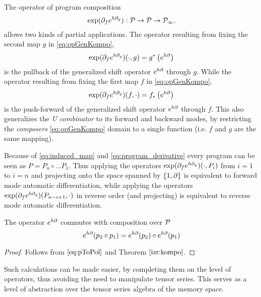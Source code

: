  The operator of program composition 
  \begin{equation}\label{eq:opGenKompo}
 \exp(\partial_fe^{h\partial_g}): \mathcal{P}\to\mathcal{P}\to\mathcal{P}_\infty,
  \end{equation}
  allows two kinds of partial applications. The operator resulting from fixing the second map $g$ in \eqref{eq:opGenKompo},
  \begin{equation}
   \exp(\partial_fe^{h\partial_g})(\cdot,g)=g^*\left( e^{h\partial} \right)\label{eq:opKompo}
 \end{equation}
  is the pullback of the generalized shift
  operator $e^{h\partial}$ through $g$. While the operator resulting from fixing the first map $f$ in \eqref{eq:opGenKompo},
  \begin{equation}
 \exp(\partial_fe^{h\partial_g})(f,\cdot)=f_*\left( e^{h\partial} \right)\label{eq:opKompoForward}
 \end{equation} 
 is the push-forward of the generalized shift operator $e^{h\partial}$ through $f$.
This also generalizes the \emph{U combinator} to its forward and backward modes, by restricting the \emph{composers} \eqref{eq:opGenKompo} domain to a single function (i.e. $f$ and $g$ are the same mapping).
 
  \begin{remark}[Unified AD]\label{trd:reverseForward}
  Because of \eqref{eq:induced_map} and \eqref{eq:program_derivative} every program can be seen as $P=P_n\circ\ldots P_1$. Thus applying the operators
  $\exp(\partial_fe^{h\partial_g})(\cdot,P_i)$ from $i=1$ to $i=n$ and projecting onto the space
  spanned by $\{1,\partial\}$ is equivalent to forward mode automatic differentiation,
  while applying the 
  operators $\exp(\partial_fe^{h\partial_g})(P_{n-i+1},\cdot)$ in reverse order (and
  projecting) is equivalent to reverse mode automatic differentiation.
 \end{remark}

   \begin{corollary}\label{izr:komp_homo}
   The operator $e^{h\partial}$ commutes with composition over $\mathcal{P}$
   \begin{equation*}
   e^{h\partial}(p_2\circ p_1)=e^{h\partial}(p_2)\circ e^{h\partial}(p_1)
   \end{equation*}
   \end{corollary}
   
   \begin{proof}
   Follows from $\eqref{eq:pToPol}$ and Theorem $\ref{izr:kompo}$.
   \end{proof}

Such calculations can be made easier, by completing them on
the level of operators, thus avoiding the need to manipulate tensor series. This serves as a level of abstraction over the tensor series algebra of the memory space.

